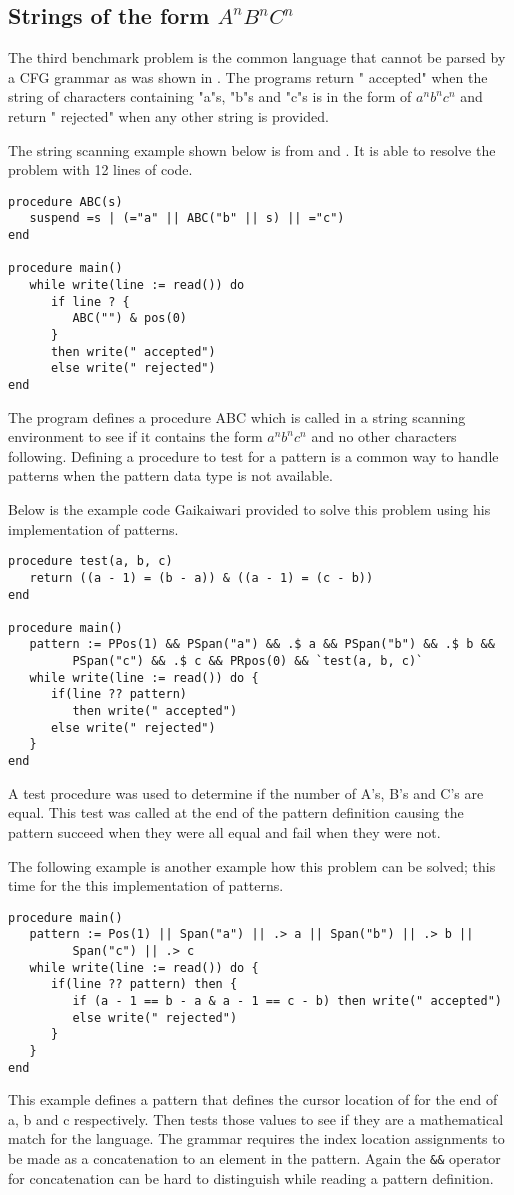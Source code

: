 \documentclass{article}
\begin{document}
\subsection{Strings of the form \emph{$A^nB^nC^n$}}
The third benchmark problem is the common language that cannot be parsed by a CFG grammar as was shown in \cite{Gaikaiwari2005}.  The programs return " accepted" when the string of characters containing "a"s, "b"s and "c"s is in the form of $a^nb^nc^n$ and return " rejected" when any other string is provided.

The string scanning example shown below is from \cite{Gaikaiwari2005} and \cite{Griswold1975}.  It is able to resolve the problem with 12 lines of code.
\begin{verbatim}
procedure ABC(s)
   suspend =s | (="a" || ABC("b" || s) || ="c")
end

procedure main()
   while write(line := read()) do
      if line ? {
         ABC("") & pos(0)
      } 
      then write(" accepted")
      else write(" rejected")
end
\end{verbatim}
The program defines a procedure ABC which is called in a string scanning environment to see if it contains the form $a^nb^nc^n$ and no other characters following.  Defining a procedure to test for a pattern is a common way to handle patterns when the pattern data type is not available.

Below is the example code Gaikaiwari provided to solve this problem using his implementation of patterns.  
\begin{verbatim}
procedure test(a, b, c)
   return ((a - 1) = (b - a)) & ((a - 1) = (c - b))
end

procedure main()
   pattern := PPos(1) && PSpan("a") && .$ a && PSpan("b") && .$ b && 
         PSpan("c") && .$ c && PRpos(0) && `test(a, b, c)`
   while write(line := read()) do {
      if(line ?? pattern) 
         then write(" accepted")
      else write(" rejected")
   }
end
\end{verbatim}
A test procedure was used to determine if the number of A's, B's and C's are equal.  This test was called at the end of the pattern definition causing the pattern succeed when they were all equal and fail when they were not.

The following example is another example how this problem can be solved; this time for the this implementation of patterns.
\begin{verbatim}
procedure main()
   pattern := Pos(1) || Span("a") || .> a || Span("b") || .> b || 
         Span("c") || .> c
   while write(line := read()) do {
      if(line ?? pattern) then {
         if (a - 1 == b - a & a - 1 == c - b) then write(" accepted")
         else write(" rejected")
      }
   }
end
\end{verbatim}
This example defines a pattern that defines the cursor location of for the end of a, b and c respectively.  Then tests those values to see if they are a mathematical match for the language.  The grammar requires the index location assignments to be made as a concatenation to an element in the pattern.  Again the \texttt{\&\&} operator for concatenation can be hard to distinguish while reading a pattern definition.
\end{document}
